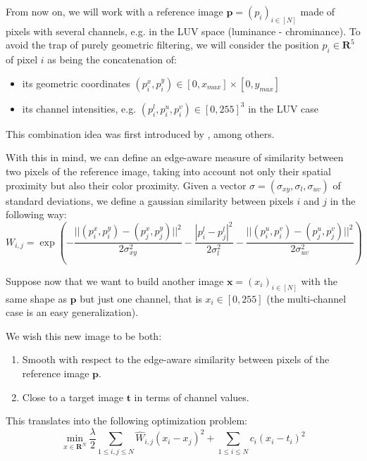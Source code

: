 \documentclass{article}
\begin{document}
From now on, we will work with a reference image $\textbf{p} = (p_i)_{i \in [N]}$ made of pixels with several channels, e.g. in the  LUV space (luminance - chrominance). To avoid the trap of purely geometric filtering, we will consider the position $p_i \in \textbf{R}^5$ of pixel $i$ as being the concatenation of:
\begin{itemize}
    \item its geometric coordinates $(p_i^x, p_i^y) \in [0, x_{max}] \times [0, y_{max}]$
    \item its channel intensities, e.g. $(p_i^l, p_i^u, p_i^v) \in [0, 255]^3$ in the LUV case
\end{itemize}

This combination idea was first introduced by \cite{tomasi_bilateral_1998}, among others.

With this in mind, we can define an edge-aware measure of similarity between two pixels of the reference image, taking into account not only their spatial proximity but also their color proximity. Given a vector $\sigma = (\sigma_{xy}, \sigma_l, \sigma_{uv})$ of standard deviations, we define a gaussian similarity between pixels $i$ and $j$ in the following way:
\begin{equation}
    W_{i, j} = \exp \left(
    - \frac{|| (p_i^x, p_i^y) - (p_j^x, p_j^y) ||^2}{2 \sigma_{xy}^2}
    - \frac{| p_i^l - p_j^l |^2}{2 \sigma_l^2}
    - \frac{|| (p_i^u, p_i^v) - (p_j^u, p_j^v) ||^2}{2 \sigma_{uv}^2}
     \right)
\end{equation}

Suppose now that we want to build another image $\textbf{x} = (x_i)_{i \in [N]}$ with the same shape as $\textbf{p}$ but just one channel, that is $x_i \in [0, 255]$ (the multi-channel case is an easy generalization).

We wish this new image to be both:
\begin{enumerate}
    \item Smooth with respect to the edge-aware similarity between pixels of the reference image $\textbf{p}$.
    \item Close to a target image $\textbf{t}$ in terms of channel values.
\end{enumerate}

This translates into the following optimization problem:
\begin{equation} \label{optim}
    \min_{x \in \textbf{R}^N} \frac{\lambda}{2} \sum_{1 \leq i, j \leq N}{\hat{W}_{i, j} (x_i - x_j)^2} + \sum_{1 \leq i \leq N}{c_i (x_i - t_i)^2}
\end{equation}
\end{document}
